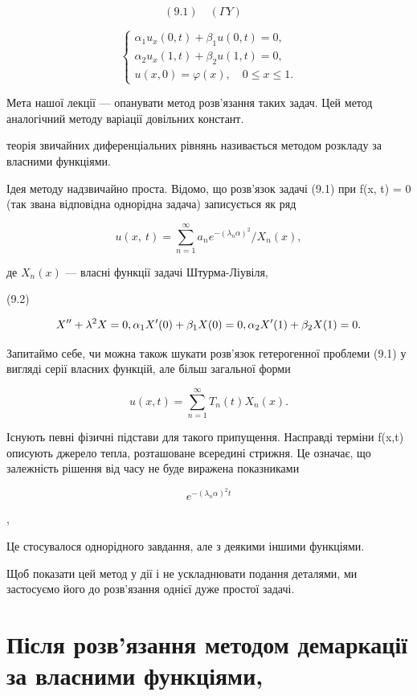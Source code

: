 \documentclass[
  ukrainian,
]{article}
\begin{document}
\[
(9.1) \quad (\Gamma Y) \quad
\]

\[
\begin{cases} \alpha_{1} u_{x}(0, t) + \beta_{1} u(0, t) = 0, \\ \alpha_{2} u_{x}(1, t) + \beta_{2} u(1, t) = 0, \\ u(x, 0) = \varphi(x), \quad 0 \le x \le 1. \end{cases}
\]

Мета нашої лекції --- опанувати метод розв'язання таких задач. Цей метод
аналогічний методу варіації довільних констант.

теорія звичайних диференціальних рівнянь називається методом розкладу за
власними функціями.

Ідея методу надзвичайно проста. Відомо, що розв'язок задачі (9.1) при
f(x, t) = 0 (так звана відповідна однорідна задача) записується як ряд

\[
u\left(x,\ t\right)=\sum_{n=1}^{\infty}a_{n}e^{-\left(\lambda_{n}\alpha\right)^{2}}/X_{n}\left(x\right),
\]

де \(X_n(x)\) --- власні функції задачі Штурма-Ліувіля,

(9.2)

\[
X'' + \lambda^2 X = 0, \\ \alpha_1 X'(0) + \beta_1 X(0) = 0, \\ \alpha_2 X'(1) + \beta_2 X(1) = 0.
\]

Запитаймо себе, чи можна також шукати розв'язок гетерогенної проблеми
(9.1) у вигляді серії власних функцій, але більш загальної форми

\[
u(x, t) = \sum_{n=1}^{\infty} T_n(t) X_n(x).
\]

Існують певні фізичні підстави для такого припущення. Насправді терміни
f(x,t) описують джерело тепла, розташоване всередині стрижня. Це
означає, що залежність рішення від часу не буде виражена показниками

\[
e^{-(\lambda_n\alpha)^2 t}
\]

,

Це стосувалося однорідного завдання, але з деякими іншими функціями.

Щоб показати цей метод у дії і не ускладнювати подання деталями, ми
застосуємо його до розв'язання однієї дуже простої задачі.

\section{Після розв'язання методом демаркації за власними
функціями,}\label{ux43fux456ux441ux43bux44f-ux440ux43eux437ux432ux44fux437ux430ux43dux43dux44f-ux43cux435ux442ux43eux434ux43eux43c-ux434ux435ux43cux430ux440ux43aux430ux446ux456ux457-ux437ux430-ux432ux43bux430ux441ux43dux438ux43cux438-ux444ux443ux43dux43aux446ux456ux44fux43cux438}
\end{document}
